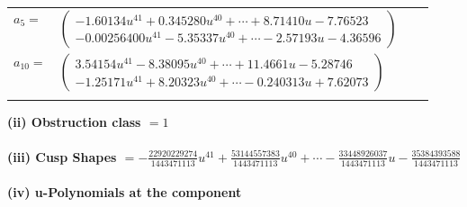\documentclass[1p]{elsarticle_modified}
\theoremstyle{definition}
\begin{document}
\begin{tabular}{m{7pt} m{180pt} m{7pt} m{180pt} }
\flushright $a_{5}=$&$\begin{pmatrix}-1.60134 u^{41}+0.345280 u^{40}+\cdots+8.71410 u-7.76523\\-0.00256400 u^{41}-5.35337 u^{40}+\cdots-2.57193 u-4.36596\end{pmatrix}$ \\
\flushright $a_{10}=$&$\begin{pmatrix}3.54154 u^{41}-8.38095 u^{40}+\cdots+11.4661 u-5.28746\\-1.25171 u^{41}+8.20323 u^{40}+\cdots-0.240313 u+7.62073\end{pmatrix}$\\&\end{tabular}
\flushleft \textbf{(ii) Obstruction class $= 1$}\\~\\
\flushleft \textbf{(iii) Cusp Shapes $= -\frac{22920229274}{1443471113} u^{41}+\frac{53144557383}{1443471113} u^{40}+\cdots-\frac{33448926037}{1443471113} u-\frac{35384393588}{1443471113}$}\\~\\
\newpage\renewcommand{\arraystretch}{1}
\flushleft \textbf{(iv) u-Polynomials at the component}\newline \\
\end{document}
